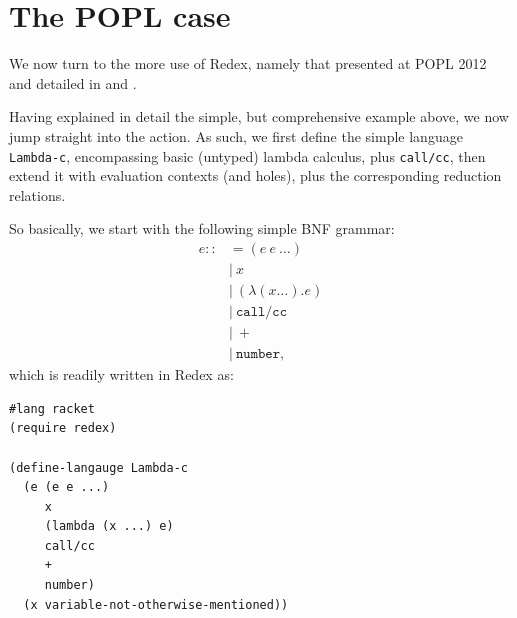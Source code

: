 \section{The POPL case}

We now turn to the more  use of Redex, namely that presented at
POPL 2012 and detailed in \cite{popl} and \cite{sewpr}.

Having explained in detail the simple, but comprehensive example above,
we now jump straight into the action. As such, we first define the simple
language \texttt{Lambda-c}, encompassing basic (untyped) lambda calculus,
plus \texttt{call/cc}, then extend it with evaluation contexts (and holes),
plus the corresponding reduction relations.

So basically, we start with the following simple BNF grammar:
\begin{align*}
  e ::&= (e \ e \ \dots) \\
      &| \ x \\
      &| \ (\lambda (x \dots). e) \\
      &| \ \texttt{call/cc} \\
      &| \ + \\
      &| \ \texttt{number},
\end{align*}
which is readily written in Redex as:
{
  \small
\begin{verbatim}
#lang racket
(require redex)

(define-langauge Lambda-c
  (e (e e ...)
     x
     (lambda (x ...) e)
     call/cc
     +
     number)
  (x variable-not-otherwise-mentioned))
\end{verbatim}
}

